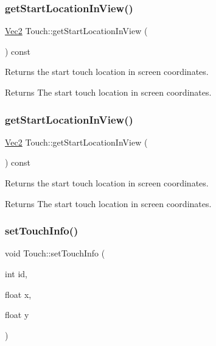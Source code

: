 \subsubsection{\texorpdfstring{get\+Start\+Location\+In\+View()}{getStartLocationInView()}\hspace{0.1cm}{\footnotesize\ttfamily [1/2]}}
{\footnotesize\ttfamily \hyperlink{classVec2}{Vec2} Touch\+::get\+Start\+Location\+In\+View (\begin{DoxyParamCaption}{ }\end{DoxyParamCaption}) const}

Returns the start touch location in screen coordinates.

\begin{DoxyReturn}{Returns}
The start touch location in screen coordinates. 
\end{DoxyReturn}
\mbox{\label{classTouch_a9e7c3b29da7fc935b3e894a48f1fc716}} 
\subsubsection{\texorpdfstring{get\+Start\+Location\+In\+View()}{getStartLocationInView()}\hspace{0.1cm}{\footnotesize\ttfamily [2/2]}}
{\footnotesize\ttfamily \hyperlink{classVec2}{Vec2} Touch\+::get\+Start\+Location\+In\+View (\begin{DoxyParamCaption}{ }\end{DoxyParamCaption}) const}

Returns the start touch location in screen coordinates.

\begin{DoxyReturn}{Returns}
The start touch location in screen coordinates. 
\end{DoxyReturn}
\mbox{\label{classTouch_a9168ec4828464fb2b93138d7ea59a605}} 
\subsubsection{\texorpdfstring{set\+Touch\+Info()}{setTouchInfo()}\hspace{0.1cm}{\footnotesize\ttfamily [1/4]}}
{\footnotesize\ttfamily void Touch\+::set\+Touch\+Info (\begin{DoxyParamCaption}\item[{int}]{id,  }\item[{float}]{x,  }\item[{float}]{y }\end{DoxyParamCaption})\hspace{0.3cm}{\ttfamily [inline]}}

